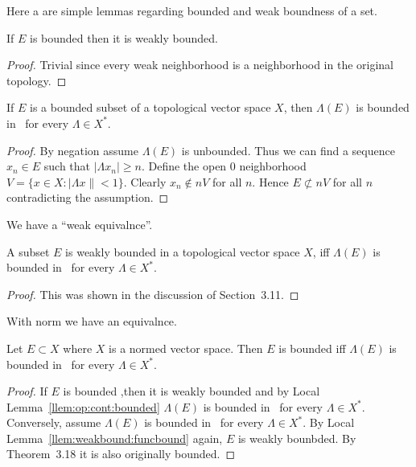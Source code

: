 Here a are simple lemmas regarding bounded and weak boundness of a set.
\begin{llem} \label{llem:bound:weakbound}
If $E$ is bounded then it is weakly bounded.
\end{llem}
\begin{proof}
Trivial since every weak neighborhood is a neighborhood
in the original topology.
\end{proof}


\begin{llem} \label{llem:bound:funcbound}
If  $E$ is a bounded subset of  a topological vector space $X$,
then \(\Lambda (E)\) is bounded in \C\ for every \(\Lambda \in X^*\).
\end{llem}
\begin{proof}
By  negation assume \(\Lambda(E)\) is unbounded.
Thus we can find a sequence \(x_n\in E\) such that \(|\Lambda x_n| \geq n\).
Define the open $0$ neighborhood \(V = \{x \in X: |\Lambda x\| < 1\}\).
Clearly \(x_n \notin nV\) for all $n$. Hence \(E \not\subset nV\) for all $n$
contradicting the assumption.
\end{proof}

We have a ``weak equivalnce''.
\begin{llem} \label{llem:weakbound:funcbound}
A subset  $E$ is weakly bounded in a topological vector space $X$,
iff \(\Lambda (E)\) is bounded in \C\ for every \(\Lambda \in X^*\).
\end{llem}
\begin{proof}
This was shown in the discussion of Section~3.11.
\end{proof}

With norm we have an equivalnce.
\begin{llem} \label{llem:bound:norm:funcbound}
Let  \(E \subset X\) where $X$ is a normed vector space.
Then $E$ is bounded iff \(\Lambda (E)\) is bounded in \C\ for
every \(\Lambda \in X^*\).
\end{llem}
\begin{proof}
If $E$ is bounded ,then it is weakly bounded and by
Local Lemma~\ref{llem:op:cont:bounded}
\(\Lambda (E)\) is bounded in \C\ for
every \(\Lambda \in X^*\).
Conversely, assume \(\Lambda (E)\) is bounded in \C\ for
every \(\Lambda \in X^*\). 
By Local Lemma~\ref{llem:weakbound:funcbound} again,
$E$ is weakly bounbded. By Theorem~3.18 it is also originally bounded.
\end{proof}

